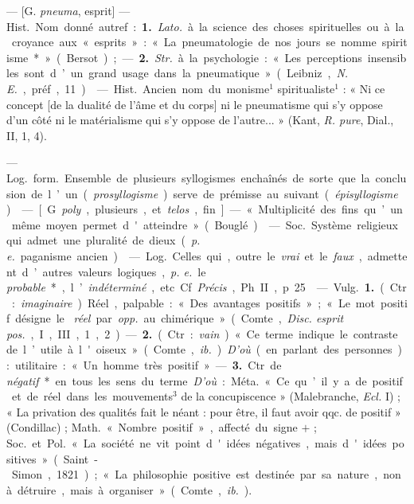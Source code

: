 \begin{itemize}[leftmargin=1cm, label=, itemsep=1pt]
 — [G. {\it pneuma}, esprit] — \si{Hist.} Nom donné
autref. : {\bf 1.} {\it Lato.} à la science des choses spirituelles ou à la
croyance aux « esprits » : « La pneumatologie
de nos jours se nomme spiritisme* » (Bersot) ; — {\bf 2.} {\it Str.} à la
psychologie : « Les perceptions insensibles sont d’un grand usage dans la
pneumatique » (Leibniz, {\it N. E.}, préf., 11).

 — \si{Hist.} Ancien nom du monisme$^1$ spiritualiste$^1$ : «
Ni ce concept [de la dualité de l'âme et du corps] ni le pneumatisme qui s’y
oppose d’un côté ni le matérialisme qui s’y oppose de l’autre... » (Kant,
{\it R. pure}, Dial., II, 1, 4).

 — \si{Log.} \si{form.} Ensemble de plusieurs syllogismes
enchaînés de sorte que la conclusion de l’un ({\it prosyllogisme}) serve de
prémisse au suivant ({\it épisyllogisme}).

 — [G. {\it poly}, plusieurs, et {\it telos}, fin] — «
Multiplicité des fins qu’un même moyen permet d'atteindre » (Bouglé).

 — \si{Soc.} Système religieux qui admet une pluralité de
dieux ({\it p. e.} paganisme ancien).

 — \si{Log.} Celles qui, outre le {\it vrai} et
le {\it faux}, admettent d’autres valeurs logiques, {\it p. e.} le {\it
probable}*, l’{\it indéterminé}, etc. Cf. {\it Précis}, Ph. II, p. 25.

 — \si{Vulg.} {\bf 1.} (Ctr. : {\it imaginaire}). Réel,
palpable : « Des avantages positifs » ; « Le mot positif désigne le {\it
réel} par {\it opp.} au chimérique » (Comte, {\it Disc. esprit pos.}, I, III,
1, 2). —  {\bf 2.} (Ctr. : {\it vain}). « Ce terme indique le contraste de
l’utile à l'oiseux » (Comte, {\it ib.}). {\it D'où} (en parlant des
personnes) : utilitaire : « Un homme très positif. » — {\bf 3.} Ctr. de {\it
négatif}* en tous les sens du terme. {\it D'où} : \si{Méta.} « Ce qu’il y a
de positif et de réel dans les mouvements$^3$ de la concupiscence »
(Malebranche, {\it Ecl.} I) ; « La privation des qualités fait le néant :
pour être, il faut avoir qqc. de positif » (Condillac) ; \si{Math.} « Nombre
positif », affecté du signe $+$ ; \si{Soc.} et \si{Pol.} « La société ne vit
point d'idées négatives, mais d'idées positives » (Saint-Simon, 1821) ; « La
philosophie positive est destinée par sa nature, non à détruire, mais à
organiser » (Comte, {\it ib.}).


\end{itemize}
